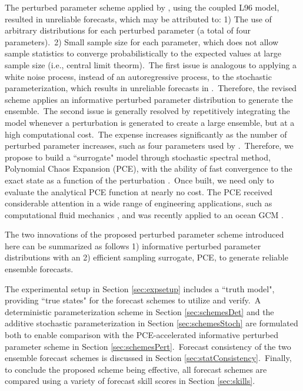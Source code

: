 	The perturbed parameter scheme applied by \citet{Arnold13},
	using the coupled L96 model, resulted in unreliable forecasts,
	which may be attributed to: 
	1) The use of arbitrary distributions for each perturbed parameter (a total of four parameters).\
	2) Small sample size for each parameter, which does not allow sample statistics 
	to converge probabilistically to the expected values at large sample size (i.e., central limit theorm).\
	The first issue	is analogous to applying a white noise process, instead of an 
	autoregressive process, to the stochastic parameterization,
	which results in unreliable forecasts in \citet{Arnold13}.\
	Therefore, the revised scheme applies an informative perturbed parameter distribution to generate the ensemble.\ 
	The second issue is generally resolved by repetitively integrating the model 
	whenever a perturbation is generated to create a large ensemble, but at a high computational cost.\
	The expense increases significantly as the number of perturbed 
	parameter increases, such as four parameters used by \citet{Arnold13}.\
	Therefore, we propose to build a ``surrogate" model
	through stochastic spectral method, Polynomial Chaos Expansion (PCE), 
	with the ability of fast convergence to the exact state as a function of the perturbation {\citep{Lucor01}}.\ 
	Once built, we need only to evaluate the analytical PCE function at nearly no cost.
	The PCE received considerable attention in a wide range of engineering applications, 
	such as computational fluid mechanics {\citep{Hosder06}}, 
	and was recently applied to an ocean GCM {\citep{Alex12}}.\

	
	The two innovations of the proposed perturbed parameter scheme introduced here can be summarized as follows
	1) informative perturbed parameter distributions with an 2) efficient sampling surrogate, PCE,
	to generate reliable ensemble forecasts.\



	The experimental setup in Section \ref{sec:expsetup} includes a ``truth model", 
	providing ``true states" for the forecast schemes to utilize and verify.\
	A deterministic parameterization scheme in Section \ref{sec:schemesDet}
	and the additive stochastic parameterization in Section \ref{sec:schemesStoch}
	are formulated both to enable comparison with 
	the PCE-accelerated informative perturbed parameter scheme in Section \ref{sec:schemesPert}.\
	Forecast consistency of the two ensemble forecast schemes is discussed in Section \ref{sec:statConsistency}.\  
	Finally, to conclude the proposed scheme being effective, all forecast schemes are
	compared using a variety of forecast skill scores in Section \ref{sec:skills}.\ 

